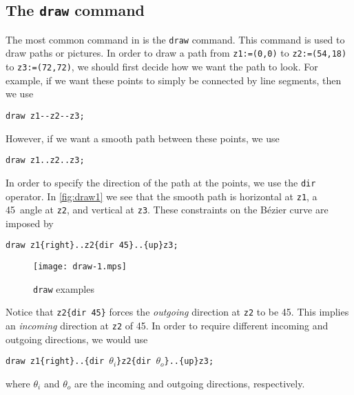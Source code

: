 \subsection{The \texttt{draw} command}

The most common command in \MP{} is the \texttt{draw} command.  This
command is used to draw paths or pictures.  In order to draw a path from
\texttt{z1:=(0,0)} to \texttt{z2:=(54,18)} to \texttt{z3:=(72,72)}, we
should first decide how we want the path to look.  For example, if we
want these points to simply be connected by line segments, then we
use

\begin{center}
  \verb|draw z1--z2--z3;|
\end{center}

However, if we want a smooth path between these points, we use

\begin{center}
  \verb|draw z1..z2..z3;|
\end{center}

In order to specify the direction of the path at the points, we use the
\texttt{dir} operator.  In \autoref{fig:draw1} we see that the smooth
path is horizontal at \texttt{z1}, a 45\textdegree\ angle at
\texttt{z2}, and vertical at \texttt{z3}.  These constraints on the
B\'{e}zier curve are imposed by

\begin{center}
  \verb|draw z1{right}..z2{dir 45}..{up}z3;|
\end{center}

\begin{figure}
  \centering
  \texttt{[image: draw-1.mps]}
  \caption{\texttt{draw} examples}
  \label{fig:draw1}
\end{figure}

Notice that \verb|z2{dir 45}| forces the \textit{outgoing} direction at
\texttt{z2} to be 45\textdegree.  This implies an \textit{incoming}
direction at \texttt{z2} of 45\textdegree.  In order to require
different incoming and outgoing directions, we would use

\begin{center}
  \verb|draw z1{right}..{dir |$\theta_i$\verb|}z2{dir |$\theta_o$\verb|}..{up}z3;|
\end{center}
where $\theta_i$ and $\theta_o$ are the incoming and outgoing
directions, respectively.
